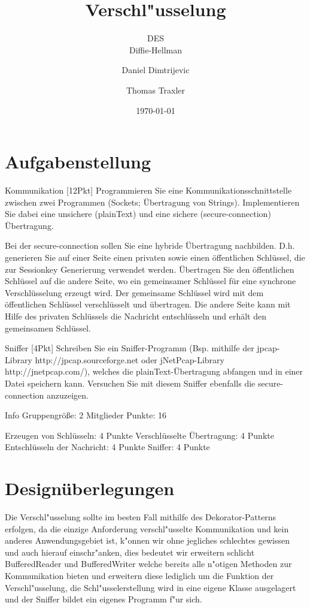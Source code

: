 \documentclass[a4paper,12pt]{scrreprt}
\begin{document}
\author{Daniel Dimtrijevic \and Thomas Traxler} %
\title{ Verschl"usselung } %
\subject{VSDB} %
\subtitle{ DES \\ Diffie-Hellman } %
\date{\today} %
\publishers{5AHITT} %

\maketitle
\tableofcontents


\chapter{Aufgabenstellung}
Kommunikation [12Pkt]
Programmieren Sie eine Kommunikationsschnittstelle zwischen zwei Programmen (Sockets; Übertragung von Strings). Implementieren Sie dabei eine unsichere (plainText) und eine sichere (secure-connection) Übertragung.

Bei der secure-connection sollen Sie eine hybride Übertragung nachbilden. D.h. generieren Sie auf einer Seite einen privaten sowie einen öffentlichen Schlüssel, die zur Sessionkey Generierung verwendet werden. Übertragen Sie den öffentlichen Schlüssel auf die andere Seite, wo ein gemeinsamer Schlüssel für eine synchrone Verschlüsselung erzeugt wird. Der gemeinsame Schlüssel wird mit dem öffentlichen Schlüssel verschlüsselt und übertragen. Die andere Seite kann mit Hilfe des privaten Schlüssels die Nachricht entschlüsseln und erhält den gemeinsamen Schlüssel.

Sniffer [4Pkt]
Schreiben Sie ein Sniffer-Programm (Bsp. mithilfe der jpcap-Library http://jpcap.sourceforge.net  oder jNetPcap-Library http://jnetpcap.com/), welches die plainText-Übertragung abfangen und in einer Datei speichern kann. Versuchen Sie mit diesem Sniffer ebenfalls die secure-connection anzuzeigen.

Info
Gruppengröße: 2 Mitglieder
Punkte: 16

    Erzeugen von Schlüsseln: 4 Punkte
    Verschlüsselte Übertragung: 4 Punkte
    Entschlüsseln der Nachricht: 4 Punkte
    Sniffer: 4 Punkte

	
\chapter{Designüberlegungen}
	Die Verschl"usselung sollte im besten Fall mithilfe des Dekorator-Patterns erfolgen, da die einzige Anforderung verschl"usselte Kommunikation und kein anderes Anwendungsgebiet ist, k"onnen wir ohne jegliches schlechtes gewissen und auch hierauf einschr"anken, dies bedeutet wir erweitern schlicht BufferedReader und BufferedWriter welche bereits alle n"otigen Methoden zur Kommunikation bieten und erweitern diese lediglich um die Funktion der Verschl"usselung, die Schl"usselerstellung wird in eine eigene Klasse ausgelagert und der Sniffer bildet ein eigenes Programm f"ur sich.
\end{document}
